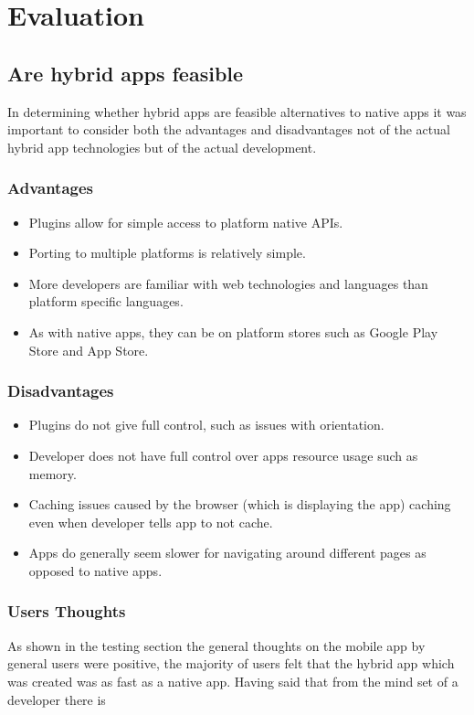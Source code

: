 \chapter{Evaluation}

\section{Are hybrid apps feasible}
In determining whether hybrid apps are feasible alternatives to native apps it was important to consider both the advantages and disadvantages not of the actual hybrid app technologies but of the actual development.

\subsection{Advantages}
\begin{itemize}
	\item Plugins allow for simple access to platform native APIs.
	\item Porting to multiple platforms is relatively simple.
	\item More developers are familiar with web technologies and languages than platform specific languages.
	\item As with native apps, they can be on platform stores such as Google Play Store and App Store.
\end{itemize}
\subsection{Disadvantages}
\begin{itemize}
    \item Plugins do not give full control, such as issues with orientation.
    \item Developer does not have full control over apps resource usage such as memory.
    \item Caching issues caused by the browser (which is displaying the app) caching even when developer tells app to not cache.
    \item Apps do generally seem slower for navigating around different pages as opposed to native apps. 
\end{itemize}
\subsection{Users Thoughts}
As shown in the testing section the general thoughts on the mobile app by general users were positive, the majority of users felt that the hybrid app which was created was as fast as a native app. Having said that from the mind set of a developer there is 
